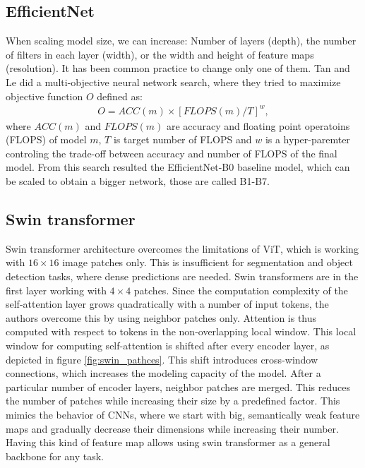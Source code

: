 \subsection{EfficientNet}
When scaling model size, we can increase: Number of layers (depth), the number of filters in each layer (width), or the width and height of feature maps (resolution). It has been common practice to change only one of them. Tan and Le \cite{Tan2019a} did a multi-objective neural network search, where they tried to maximize objective function $O$ defined as:
\begin{align}
    O = ACC \left( m \right) \times \left[ FLOPS \left(m \right) / T \right] ^w,
\end{align}
where $ACC(m)$ and $FLOPS(m)$ are accuracy and floating point operatoins (FLOPS) of model $m$, $T$ is target number of FLOPS and $w$ is a hyper-paremter controling the trade-off between accuracy and number of FLOPS of the final model. From this search resulted the EfficientNet-B0 baseline model, which can be scaled to obtain a bigger network, those are called B1-B7.

\subsection{Swin transformer}
Swin transformer architecture overcomes the limitations of ViT, which is working with $16 \times 16$ image patches only. This is insufficient for segmentation and object detection tasks, where dense predictions are needed. Swin transformers are in the first layer working with $4 \times 4$ patches. Since the computation complexity of the self-attention layer grows quadratically with a number of input tokens, the authors overcome this by using neighbor patches only. Attention is thus computed with respect to tokens in the non-overlapping local window. This local window for computing self-attention is shifted after every encoder layer, as depicted in figure \ref{fig:swin_pathces}. This shift introduces cross-window connections, which increases the modeling capacity of the model. After a particular number of encoder layers, neighbor patches are merged. This reduces the number of patches while increasing their size by a predefined factor. This mimics the behavior of CNNs, where we start with big, semantically weak feature maps and gradually decrease their dimensions while increasing their number. Having this kind of feature map allows using swin transformer as a general backbone for any task. \cite{Liu2021}

